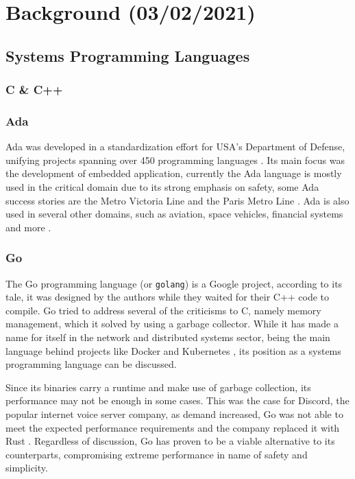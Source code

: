 \chapter{Background (03/02/2021)}\label{cha:background}

\section{Systems Programming Languages}\label{sec:systems-programming}

\subsection{C \& C++}

\subsection{Ada}

Ada was developed in a standardization effort for USA's Department of Defense,
unifying projects spanning over 450 programming languages \autocite{Ada2021}.
Its main focus was the development of embedded application,
currently the Ada language is mostly used in the critical domain due to its strong emphasis on safety,
some Ada success stories are the Metro Victoria Line and the Paris Metro Line \autocite{SIGAda2021}.
Ada is also used in several other domains, such as aviation, space vehicles, financial systems and more \autocite{Feldman2014}.

\subsection{Go}

The Go programming language (or \texttt{golang}) is a Google project,
according to its tale, it was designed by the authors while they waited for their C++ code to compile.
Go tried to address several of the criticisms to C, namely memory management,
which it solved by using a garbage collector.
While it has made a name for itself in the network and distributed systems sector,
being the main language behind projects like Docker \autocite{Docker2021} and Kubernetes \autocite{Kubernetes2021},
its position as a systems programming language can be discussed.

Since its binaries carry a runtime and make use of garbage collection, its performance may not be enough in some cases.
This was the case for Discord, the popular internet voice server company,
as demand increased, Go was not able to meet the expected performance requirements and the company replaced it with Rust \autocite{Howarth2020}.
Regardless of discussion, Go has proven to be a viable alternative to its counterparts,
compromising extreme performance in name of safety and simplicity.

